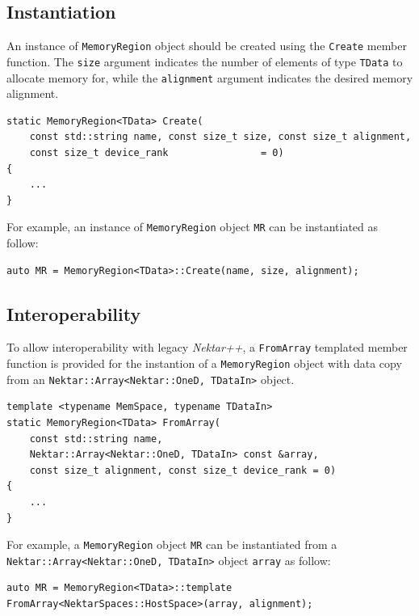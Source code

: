 \subsection{Instantiation}
An instance of \lstinline[style=C++Style]!MemoryRegion! object should be created using the \lstinline[style=C++Style]!Create! member function. The \lstinline[style=C++Style]!size! argument indicates the number of elements of type \lstinline[style=C++Style]!TData! to allocate memory for, while the \lstinline[style=C++Style]!alignment! argument indicates the desired memory alignment.
\begin{lstlisting}[style=C++Style]
static MemoryRegion<TData> Create(
    const std::string name, const size_t size, const size_t alignment,
    const size_t device_rank                = 0)
{
    ...
}
\end{lstlisting}

For example, an instance of \lstinline[style=C++Style]!MemoryRegion! object \lstinline[style=C++Style]!MR! can be instantiated as follow:
\begin{lstlisting}[style=C++Style]
auto MR = MemoryRegion<TData>::Create(name, size, alignment);
\end{lstlisting}

\subsection{Interoperability}
To allow interoperability with legacy \emph{Nektar++}, a \lstinline[style=C++Style]!FromArray! templated member function is provided for the instantion of a \lstinline[style=C++Style]!MemoryRegion! object with data copy from an \lstinline[style=C++Style]!Nektar::Array<Nektar::OneD, TDataIn>! object.
\begin{lstlisting}[style=C++Style]
template <typename MemSpace, typename TDataIn>
static MemoryRegion<TData> FromArray(
    const std::string name,
    Nektar::Array<Nektar::OneD, TDataIn> const &array,
    const size_t alignment, const size_t device_rank = 0)
{
    ...
}
\end{lstlisting}

For example, a \lstinline[style=C++Style]!MemoryRegion! object \lstinline[style=C++Style]!MR! can be instantiated from a \lstinline[style=C++Style]!Nektar::Array<Nektar::OneD, TDataIn>! object \lstinline[style=C++Style]!array! as follow:
\begin{lstlisting}[style=C++Style]
auto MR = MemoryRegion<TData>::template FromArray<NektarSpaces::HostSpace>(array, alignment);
\end{lstlisting}

